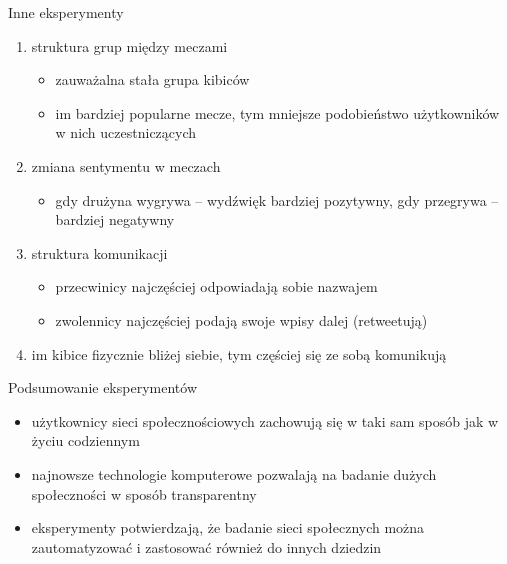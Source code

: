 \documentclass{beamer}
\begin{document}
\begin{frame}{Inne eksperymenty}
\begin{enumerate}
  \item struktura grup między meczami
  \begin{itemize}
    \item zauważalna stała grupa kibiców
    \item im bardziej popularne mecze, tym mniejsze podobieństwo użytkowników
    w nich uczestniczących 
  \end{itemize}
  \item zmiana sentymentu w meczach
  \begin{itemize}
    \item gdy drużyna wygrywa -- wydźwięk bardziej pozytywny, gdy przegrywa --
    bardziej negatywny
  \end{itemize}
  \item struktura komunikacji
  \begin{itemize}
    \item przecwinicy najczęściej odpowiadają sobie nazwajem
    \item zwolennicy najczęściej podają swoje wpisy dalej (retweetują)
  \end{itemize}
  \item im kibice fizycznie bliżej siebie, tym częściej się ze sobą komunikują
\end{enumerate}
\end{frame}
\begin{frame}{Podsumowanie eksperymentów}
\begin{itemize}
  \item użytkownicy sieci społecznościowych zachowują się w taki sam sposób
  jak w życiu codziennym
  \item najnowsze technologie komputerowe pozwalają na badanie dużych
  społeczności w sposób transparentny
  \item eksperymenty potwierdzają, że badanie sieci społecznych można
  zautomatyzować i zastosować również do innych dziedzin
\end{itemize}
\end{frame}
\end{document}

